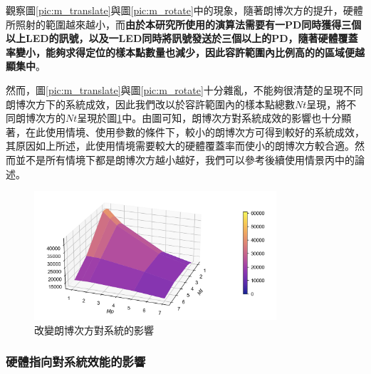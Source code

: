觀察圖\ref{pic:m_translate}與圖\ref{pic:m_rotate}中的現象，隨著朗博次方的提升，硬體所照射的範圍越來越小，而\textbf{由於本研究所使用的演算法需要有一PD同時獲得三個以上LED的訊號，以及一LED同時將訊號發送於三個以上的PD，隨著硬體覆蓋率變小，能夠求得定位的樣本點數量也減少，因此容許範圍內比例高的的區域便越顯集中}。



然而，圖\ref{pic:m_translate}與圖\ref{pic:m_rotate}十分雜亂，不能夠很清楚的呈現不同朗博次方下的系統成效，因此我們改以於容許範圍內的樣本點總數$Nt$呈現，將不同朗博次方的$Nt$呈現於圖\ref{pic:m alpha50 surface}中。由圖可知，朗博次方對系統成效的影響也十分顯著，在此使用情境、使用參數的條件下，較小的朗博次方可得到較好的系統成效，其原因如上所述，此使用情境需要較大的硬體覆蓋率而使小的朗博次方較合適。然而並不是所有情境下都是朗博次方越小越好，我們可以參考後續使用情景丙中的論述。

\begin{figure}[htpb]
    \centering
    \includegraphics[width=9cm]{ch4pic/m alpha50 surface.png}
    \caption{改變朗博次方對系統的影響}
    \label{pic:m alpha50 surface}
\end{figure}










\subsubsection{硬體指向對系統效能的影響}
\label{chp:orient_effect}

